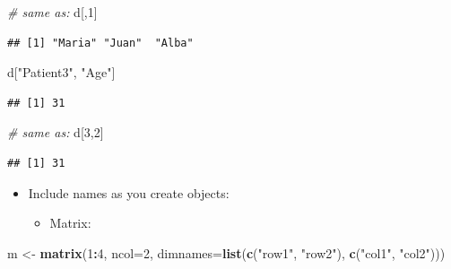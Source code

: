 \documentclass[]{book}
\newenvironment{Shaded}{\begin{snugshade}}{\end{snugshade}}
\newcommand{\CommentTok}[1]{\textcolor[rgb]{0.56,0.35,0.01}{\textit{#1}}}
\newcommand{\DataTypeTok}[1]{\textcolor[rgb]{0.13,0.29,0.53}{#1}}
\newcommand{\DecValTok}[1]{\textcolor[rgb]{0.00,0.00,0.81}{#1}}
\newcommand{\KeywordTok}[1]{\textcolor[rgb]{0.13,0.29,0.53}{\textbf{#1}}}
\newcommand{\NormalTok}[1]{#1}
\newcommand{\OperatorTok}[1]{\textcolor[rgb]{0.81,0.36,0.00}{\textbf{#1}}}
\newcommand{\StringTok}[1]{\textcolor[rgb]{0.31,0.60,0.02}{#1}}
\providecommand{\tightlist}{%
  \setlength{\itemsep}{0pt}\setlength{\parskip}{0pt}}
\begin{document}
\begin{Shaded}
\begin{Highlighting}[]
\CommentTok{# same as:}
\NormalTok{d[,}\DecValTok{1}\NormalTok{]}
\end{Highlighting}
\end{Shaded}

\begin{verbatim}
## [1] "Maria" "Juan"  "Alba"
\end{verbatim}

\begin{Shaded}
\begin{Highlighting}[]
\NormalTok{d[}\StringTok{"Patient3"}\NormalTok{, }\StringTok{"Age"}\NormalTok{]}
\end{Highlighting}
\end{Shaded}

\begin{verbatim}
## [1] 31
\end{verbatim}

\begin{Shaded}
\begin{Highlighting}[]
\CommentTok{# same as:}
\NormalTok{d[}\DecValTok{3}\NormalTok{,}\DecValTok{2}\NormalTok{]}
\end{Highlighting}
\end{Shaded}

\begin{verbatim}
## [1] 31
\end{verbatim}

\begin{Shaded}
\end{Shaded}

\begin{itemize}
\tightlist
\item
  Include names as you create objects:

  \begin{itemize}
  \tightlist
  \item
    Matrix:
  \end{itemize}
\end{itemize}

\begin{Shaded}
\begin{Highlighting}[]
\NormalTok{m <-}\StringTok{ }\KeywordTok{matrix}\NormalTok{(}\DecValTok{1}\OperatorTok{:}\DecValTok{4}\NormalTok{, }\DataTypeTok{ncol=}\DecValTok{2}\NormalTok{, }
    \DataTypeTok{dimnames=}\KeywordTok{list}\NormalTok{(}\KeywordTok{c}\NormalTok{(}\StringTok{"row1"}\NormalTok{, }\StringTok{"row2"}\NormalTok{), }\KeywordTok{c}\NormalTok{(}\StringTok{"col1"}\NormalTok{, }\StringTok{"col2"}\NormalTok{)))}
\end{Highlighting}
\end{Shaded}
\end{document}
